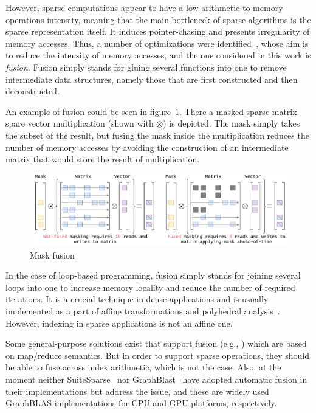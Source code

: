 However, sparse computations appear to have a low arithmetic-to-me\-mo\-ry operations intensity, meaning that the main bottleneck of sparse algorithms is the sparse representation itself.
It induces pointer-chasing and presents irregularity of memory accesses.
Thus, a number of optimizations were identified~\cite{yang2020graphblast}, whose aim is to reduce the intensity of memory accesses, and the one considered in this work is \emph{fusion}.
Fusion simply stands for gluing several functions into one to remove intermediate data structures, namely those that are first constructed and then deconstructed.

An example of fusion could be seen in figure~\ref{fig:mask_fus}.
There a masked sparse matrix-spare vector multiplication (shown with $\otimes$) is depicted.
The mask simply takes the subset of the result, but fusing the mask inside the multiplication reduces the number of memory accesses by avoiding the construction of an intermediate matrix that would store the result of multiplication. 


\begin{figure}
    \centering
    \includegraphics[width=\linewidth]{figures/MaskFusion.pdf}
    \caption{Mask fusion}
    \label{fig:mask_fus}
\end{figure}


In the case of loop-based programming, fusion simply stands for joining several loops into one to increase memory locality and reduce the number of required iterations.
It is a crucial technique in dense applications and is usually implemented as a part of affine transformations and polyhedral analysis~\cite{affine}. However, indexing in sparse applications is not an affine one.


Some general-purpose solutions exist that support fusion (e.g., \cite{Futhark}) which are based on map/reduce semantics.
But in order to support sparse operations, they should be able to fuse across index arithmetic, which is not the case.
Also, at the moment neither SuiteSparse~\cite{newsuitesparse}  nor GraphBlast~\cite{yang2020graphblast} have adopted automatic fusion in their implementations but address the issue, and these are widely used GraphBLAS implementations for CPU and GPU platforms, respectively.

